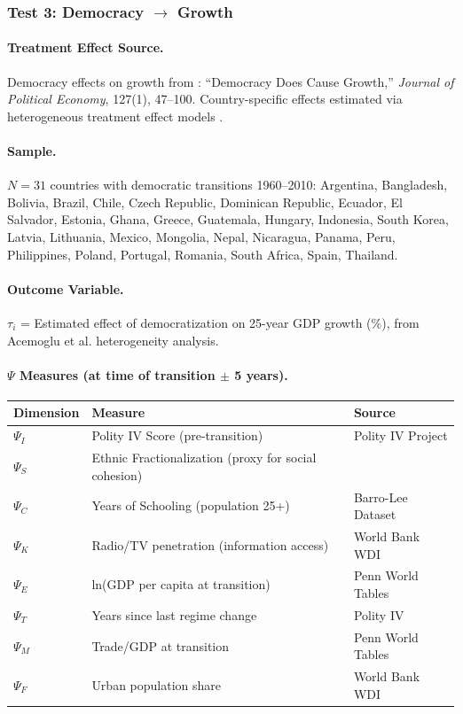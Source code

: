 \documentclass[12pt,a4paper]{article}
\begin{document}
\subsubsection{Test 3: Democracy $\rightarrow$ Growth}

\paragraph{Treatment Effect Source.}
Democracy effects on growth from \citet{acemoglu2019democracy}: ``Democracy Does Cause Growth,'' \textit{Journal of Political Economy}, 127(1), 47--100. Country-specific effects estimated via heterogeneous treatment effect models \citep{atheyimbens2019,mullainathan2017}.

\paragraph{Sample.}
$N = 31$ countries with democratic transitions 1960--2010: Argentina, Bangladesh, Bolivia, Brazil, Chile, Czech Republic, Dominican Republic, Ecuador, El Salvador, Estonia, Ghana, Greece, Guatemala, Hungary, Indonesia, South Korea, Latvia, Lithuania, Mexico, Mongolia, Nepal, Nicaragua, Panama, Peru, Philippines, Poland, Portugal, Romania, South Africa, Spain, Thailand.

\paragraph{Outcome Variable.}
$\tau_i$ = Estimated effect of democratization on 25-year GDP growth (\%), from Acemoglu et al. heterogeneity analysis.

\paragraph{$\Psi$ Measures (at time of transition $\pm$ 5 years).}
\begin{center}
\small
\begin{tabular}{@{}lll@{}}
\toprule
\textbf{Dimension} & \textbf{Measure} & \textbf{Source} \\
\midrule
$\Psi_I$ & Polity IV Score (pre-transition) & Polity IV Project \\
$\Psi_S$ & Ethnic Fractionalization (proxy for social cohesion) \citep{alesina} \\
$\Psi_C$ & Years of Schooling (population 25+) & Barro-Lee Dataset \\
$\Psi_K$ & Radio/TV penetration (information access) & World Bank WDI \\
$\Psi_E$ & ln(GDP per capita at transition) & Penn World Tables \\
$\Psi_T$ & Years since last regime change & Polity IV \\
$\Psi_M$ & Trade/GDP at transition & Penn World Tables \\
$\Psi_F$ & Urban population share & World Bank WDI \\
\bottomrule
\end{tabular}
\end{center}
\end{document}
